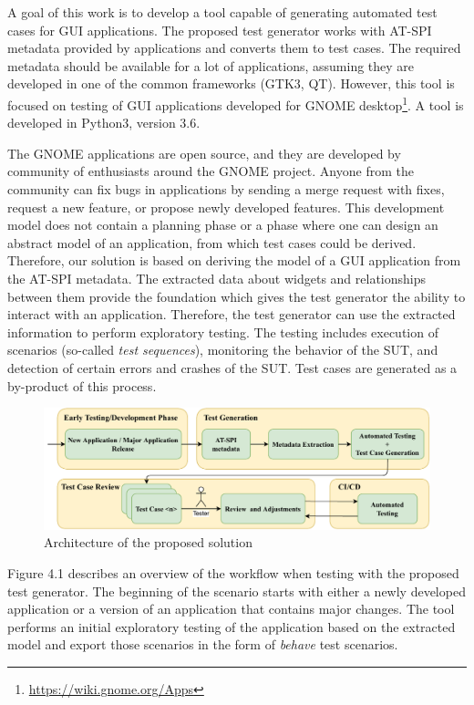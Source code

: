 A goal of this work is to develop a tool capable of generating automated test cases for GUI applications. The proposed test generator works with AT-SPI metadata provided by applications and converts them to test cases. The required metadata should be available for a lot of applications, assuming they are developed in one of the common frameworks (GTK3, QT). However, this tool is focused on testing of GUI applications developed for GNOME desktop\footnote{\url{https://wiki.gnome.org/Apps}}. A tool is developed in Python3, version 3.6.

The GNOME applications are open source, and they are developed by community of enthusiasts around the GNOME project. Anyone from the community can fix bugs in applications by sending a merge request with fixes, request a new feature, or propose newly developed features. This development model does not contain a planning phase or a phase where one can design an abstract model of an application, from which test cases could be derived. Therefore, our solution is based on deriving the model of a GUI application from the AT-SPI metadata. The extracted data about widgets and relationships between them provide the foundation which gives the test generator the ability to interact with an application. Therefore, the test generator can use the extracted information to perform exploratory testing. The testing includes execution of scenarios (so-called \textit{test sequences}), monitoring the behavior of the SUT, and detection of certain errors and crashes of the SUT. Test cases are generated as a by-product of this process.

\begin{figure}[hbt]
	\centering
	\includegraphics[width=1\textwidth]{obrazky-figures/overview.pdf}
	\caption{Architecture of the proposed solution}
	\label{Diagram}
\end{figure}

Figure 4.1 describes an overview of the workflow when testing with the proposed test generator. The beginning of the scenario starts with either a newly developed application or a version of an application that contains major changes. The tool performs an  initial exploratory testing of the application based on the extracted model and export those scenarios in the form of \textit{behave} test scenarios.

